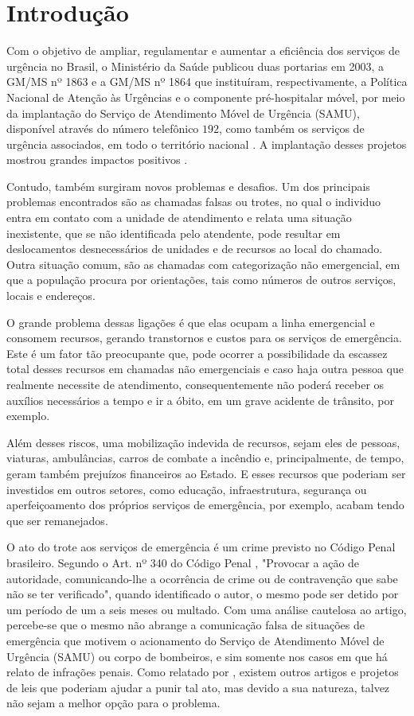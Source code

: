 \chapter{Introdução}
Com o objetivo de ampliar, regulamentar e aumentar a eficiência dos serviços de urgência no Brasil, o Ministério da Saúde publicou duas portarias em 2003, a GM/MS nº 1863 e a GM/MS nº 1864 que instituíram, respectivamente, a Política Nacional de Atenção às Urgências e o componente pré-hospitalar móvel, por meio da implantação do Serviço de Atendimento Móvel de Urgência (SAMU), disponível através do número telefônico $192$, como também os serviços de urgência associados, em todo o território nacional \citep{p1863, p1864}. A implantação desses projetos mostrou grandes impactos positivos \citep{VIEIRA2008, MACHADO2011, MINAYO2008}. 

Contudo, também surgiram novos problemas e desafios. Um dos principais problemas encontrados são as chamadas falsas ou trotes, no qual o individuo entra em contato com a unidade de atendimento e relata uma situação inexistente, que se não identificada pelo atendente, pode resultar em deslocamentos desnecessários de unidades e de recursos ao local do chamado. Outra situação comum, são as chamadas com categorização não emergencial, em que a população procura por orientações, tais como números de outros serviços, locais e endereços. 

O grande problema dessas ligações é que elas ocupam a linha emergencial e consomem recursos, gerando transtornos e custos para os serviços de emergência. Este é um fator tão preocupante que, pode ocorrer a possibilidade da escassez total desses recursos em chamadas não emergenciais e caso haja outra pessoa que realmente necessite de
atendimento, consequentemente não poderá receber os auxílios necessários a tempo e ir a óbito, em um grave acidente de trânsito, por exemplo.

Além desses riscos, uma mobilização indevida de recursos, sejam eles de pessoas, viaturas, ambulâncias, carros de combate a incêndio e, principalmente, de tempo, geram também prejuízos financeiros ao Estado. E esses recursos que poderiam ser investidos em outros setores, como educação, infraestrutura, segurança ou aperfeiçoamento dos próprios serviços de emergência, por exemplo, acabam tendo que ser remanejados.

O ato do trote aos serviços de emergência é um crime previsto no Código Penal brasileiro. Segundo o Art. nº 340 do Código Penal \citep{cp340}, "Provocar a ação de autoridade, comunicando-lhe a ocorrência de crime ou de contravenção que sabe não se ter verificado", quando identificado o autor, o mesmo pode ser detido por um período de um a seis meses ou multado. Com uma análise cautelosa ao artigo, percebe-se que o mesmo não abrange a comunicação falsa de situações de emergência que motivem o acionamento do Serviço de Atendimento Móvel de Urgência (SAMU) ou corpo de bombeiros, e sim somente nos casos em que há relato de infrações penais. Como relatado por \cite{peixoto2015combate}, existem outros artigos e projetos de leis que poderiam ajudar a punir tal ato, mas devido a sua natureza, talvez não sejam a melhor opção para o problema. 

